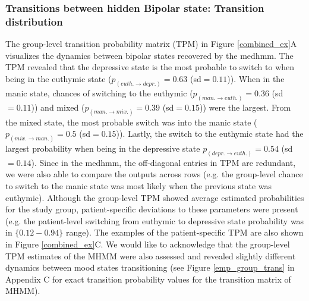 \subsubsection*{Transitions between hidden Bipolar state: Transition distribution}
The group-level transition probability matrix (TPM) in Figure \ref{combined_ex}A visualizes the dynamics between bipolar states recovered by the \ac{medhmm}. The TPM revealed that the depressive state is the most probable to switch to when being in the euthymic state ($p_{({euth.\rightarrow depr.})}=0.63$ (sd$=0.11$)). When in the manic state, chances of switching to the euthymic ($p_{({man.\rightarrow euth.})}=0.36$ (sd$=0.11$)) and mixed ($p_{({man.\rightarrow mix.})}=0.39$ (sd$=0.15$)) were the largest. From the mixed state, the most probable switch was into the manic state ($p_{({mix.\rightarrow man.})}=0.5$ (sd$=0.15$)). Lastly, the switch to the euthymic state had the largest probability when being in the depressive state $p_{({depr.\rightarrow euth.})}=0.54$ (sd$=0.14$). Since in the \ac{medhmm}, the off-diagonal entries in TPM are redundant, we were also able to compare the outputs across rows (e.g. the group-level chance to switch to the manic state was most likely when the previous state was euthymic). Although the group-level TPM showed average estimated probabilities for the study group, patient-specific deviations to these parameters were present (e.g. the patient-level switching from euthymic to depressive state probability was in $\{0.12-0.94\}$ range). The examples of the patient-specific TPM are also shown in Figure \ref{combined_ex}C. We would like to acknowledge that the group-level TPM estimates of the MHMM were also assessed and revealed slightly different dynamics between mood states transitioning (see Figure \ref{emp_group_trans} in Appendix C for exact transition probability values for the transition matrix of MHMM). 

